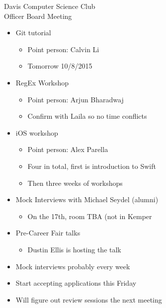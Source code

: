 \documentclass{article}
\begin{document}
\begin{Minutes}{Davis Computer Science Club\\Officer Board Meeting}

\begin {itemize} 
\item Git tutorial
    \begin {itemize}
    \item Point person: Calvin Li
    \item Tomorrow 10/8/2015
    \end {itemize}
\item RegEx Workshop
    \begin {itemize}
    \item Point person: Arjun Bharadwaj
    \item Confirm with Laila so no time conflicts
    \end {itemize}
\item iOS workshop
    \begin {itemize}
    \item Point person: Alex Parella
    \item Four in total, first is introduction to Swift
    \item Then three weeks of workshops
    \end {itemize}
\end {itemize}

\begin {itemize}
\item Mock Interviews with Michael Seydel (alumni)
    \begin {itemize}
    \item On the 17th, room TBA (not in Kemper
    \end {itemize}
\item Pre-Career Fair talks
    \begin{itemize} 
    \item Dustin Ellis is hosting the talk
    \end {itemize}
\item Mock interviews probably every week
\end {itemize}

\begin {itemize}
\item Start accepting applications this Friday
\item Will figure out review sessions the next meeting 
\end {itemize}


\end{Minutes}
\end{document}
